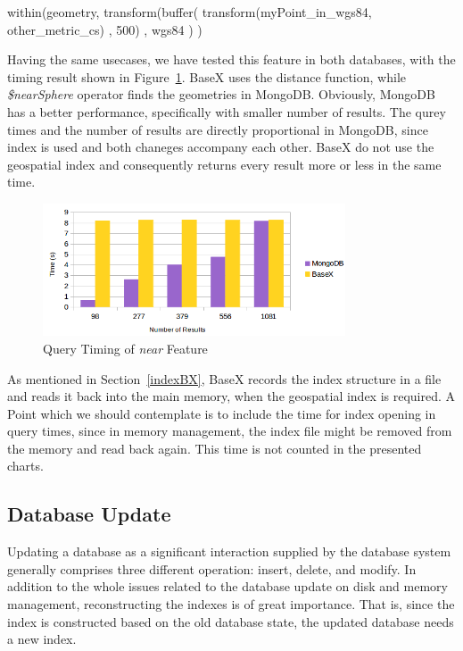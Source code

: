 \documentclass[a4paper,12pt]{article}
\begin{document}
\vspace{10px}
\begin{fakeJSON} 
within(geometry,
       transform(buffer(
                   transform(myPoint_in_wgs84, other_metric_cs)
                   , 500)
                 , wgs84
                )
      )
\end{fakeJSON}
\vspace{10px}
Having the same usecases, we have tested this feature in both databases, with the timing result shown in Figure~\ref{figBXvsMongoNear}. BaseX uses the distance function, while \textit{\$nearSphere} operator finds the geometries in MongoDB. Obviously, MongoDB has a better performance, specifically with smaller number of results. The qurey times and the number of results are directly proportional in MongoDB, since index is used and both chaneges accompany each other. BaseX do not use the geospatial index and consequently returns every result more or less in the same time.



\begin{figure}
\centering
\includegraphics[width=0.8\textwidth]{BXvsMongoNear.png}
\caption{Query Timing of \textit{near} Feature}
\label{figBXvsMongoNear}
\end{figure}


As mentioned in Section~\ref{indexBX}, BaseX records the index structure in a file and reads it back into the main memory, when the geospatial index is required. A Point which we should contemplate is to include the time for index opening in query times, since in memory management, the index file might be removed from the memory and read back again. This time is not counted in the presented charts.


\subsection{Database Update}
\label{update}
Updating a database as a significant interaction supplied by the database system generally comprises three different operation: insert, delete, and modify. In addition to the whole issues related to the database update on disk and memory management, reconstructing the indexes is of great importance. That is, since the index is constructed based on the old database state, the updated database needs a new index. 
\end{document}
